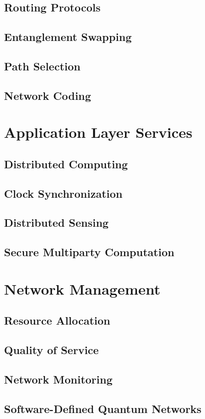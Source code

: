\documentclass[12pt,a4paper]{book}
\begin{document}
\subsection{Routing Protocols}
\subsection{Entanglement Swapping}
\subsection{Path Selection}
\subsection{Network Coding}

\section{Application Layer Services}
\subsection{Distributed Computing}
\subsection{Clock Synchronization}
\subsection{Distributed Sensing}
\subsection{Secure Multiparty Computation}

\section{Network Management}
\subsection{Resource Allocation}
\subsection{Quality of Service}
\subsection{Network Monitoring}
\subsection{Software-Defined Quantum Networks}
\end{document}
